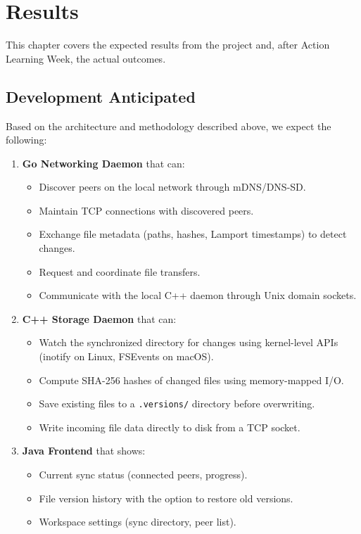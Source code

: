 \chapter{Results}

This chapter covers the expected results from the project and, after Action Learning Week, the actual outcomes.

\section{Development Anticipated}
\label{sec:results-anticipated}

Based on the architecture and methodology described above, we expect the following:

\begin{enumerate}
    \item \textbf{Go Networking Daemon} that can:
    \begin{itemize}
        \item Discover peers on the local network through mDNS/DNS-SD.
        \item Maintain TCP connections with discovered peers.
        \item Exchange file metadata (paths, hashes, Lamport timestamps) to detect changes.
        \item Request and coordinate file transfers.
        \item Communicate with the local C++ daemon through Unix domain sockets.
    \end{itemize}

    \item \textbf{C++ Storage Daemon} that can:
    \begin{itemize}
        \item Watch the synchronized directory for changes using kernel-level APIs (inotify on Linux, FSEvents on macOS).
        \item Compute SHA-256 hashes of changed files using memory-mapped I/O.
        \item Save existing files to a \texttt{.versions/} directory before overwriting.
        \item Write incoming file data directly to disk from a TCP socket.
    \end{itemize}

    \item \textbf{Java Frontend} that shows:
    \begin{itemize}
        \item Current sync status (connected peers, progress).
        \item File version history with the option to restore old versions.
        \item Workspace settings (sync directory, peer list).
    \end{itemize}


\end{enumerate}
